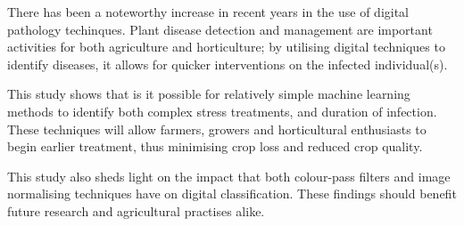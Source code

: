 \documentclass[../../Paper.tex]{subfiles}
\begin{document}
There has been a noteworthy increase in recent years in the use of digital pathology techinques. Plant disease detection and management are important activities for both agriculture and horticulture; by utilising digital techniques to identify diseases, it allows for quicker interventions on the infected individual(s).

This study shows that is it possible for relatively simple machine learning methods to identify both complex stress treatments, and duration of infection. These techniques will allow farmers, growers and horticultural enthusiasts to begin earlier treatment, thus minimising crop loss and reduced crop quality. 

This study also sheds light on the impact that both colour-pass filters and image normalising techniques have on digital classification. These findings should benefit future research and agricultural practises alike.
\end{document}
